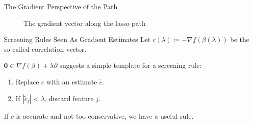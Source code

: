 \documentclass[10pt,ignorenonframetext]{beamer}
\begin{document}

\begin{frame}{The Gradient Perspective of the Path}
  \begin{figure}
    
    \caption{The gradient vector along the lasso path}
  \end{figure}
\end{frame}

\begin{frame}{Screening Rules Seen As Gradient Estimates}
  Let \(c(\lambda) \coloneqq -\nabla f(\beta(\lambda))\)
  be the so-called \alert{correlation} vector.

  \medskip

  \(\boldsymbol{0} \in \nabla f(\beta)
  + \lambda \partial\) suggests a simple template for a screening rule:
  \begin{enumerate}
    \item Replace \(c\) with an estimate \(\tilde c\).
    \item If \(|\tilde c_j| < \lambda\), discard feature \(j\).
  \end{enumerate}

  \medskip

  If \(\tilde c\) is accurate and not too conservative, we
  have a useful rule.
\end{frame}



%       
\end{document}
